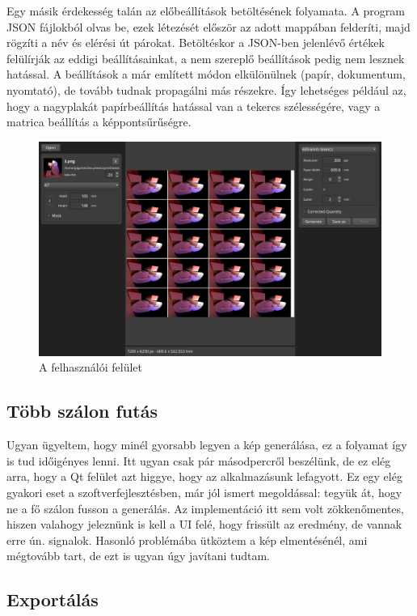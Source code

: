 Egy másik érdekesség talán az előbeállítások betöltésének folyamata. A program JSON fájlokból olvas be, ezek létezését először az adott mappában felderíti, majd rögzíti a név és elérési út párokat. Betöltéskor a JSON-ben jelenlévő értékek felülírják az eddigi beállításainkat, a nem szereplő beállítások pedig nem lesznek hatással. A beállítások a már említett módon elkülönülnek (papír, dokumentum, nyomtató), de tovább tudnak propagálni más részekre. Így lehetséges például az, hogy a nagyplakát papírbeállítás hatással van a tekercs szélességére, vagy a matrica beállítás a képpontsűrűségre. 

\begin{figure}
    \includegraphics[width=\textwidth]{figures/ui_showcase.png}
    \caption{A felhasználói felület}
    \label{fig:ui_screenshot}
\end{figure}

\subsection{Több szálon futás}

Ugyan ügyeltem, hogy minél gyorsabb legyen a kép generálása, ez a folyamat így is tud időigényes lenni. Itt ugyan csak pár másodpercről beszélünk, de ez elég arra, hogy a Qt felület azt higgye, hogy az alkalmazásunk lefagyott. Ez egy elég gyakori eset a szoftverfejlesztésben, már jól ismert megoldással: tegyük át, hogy ne a fő szálon fusson a generálás. Az implementáció itt sem volt zökkenőmentes, hiszen valahogy jeleznünk is kell a UI felé, hogy frissült az eredmény, de vannak erre ún. signalok. Hasonló problémába ütköztem a kép elmentésénél, ami mégtovább tart, de ezt is ugyan úgy javítani tudtam. 

\subsection{Exportálás}


